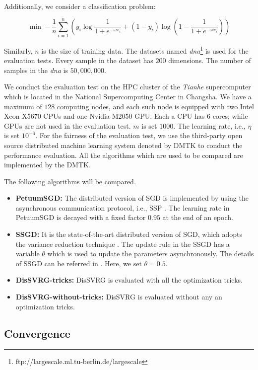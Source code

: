 \documentclass[10pt,journal,finalsubmission,compsoc]{IEEEtran}
\begin{document}
Additionally, we consider a classification problem:

\begin{equation}
\label{standard_sgd}
\min -\frac{1}{n}\sum\limits_{i=1}^n\left(y_i\log\frac{1}{1+e^{-\omega x_i}}+(1-y_i)\log(1-\frac{1}{1+e^{-\omega x_i}})\right)
\end{equation}

Similarly, $n$ is the size of training data. The datasets named \emph{dna}\footnote{ftp://largescale.ml.tu-berlin.de/largescale} is used for the evaluation tests. Every sample in the dataset has $200$ dimensions.  The number of samples in the \emph{dna} is $50,000,000$.

We conduct the evaluation test on the HPC cluster of the \emph{Tianhe} supercomputer which is located in the National Supercomputing Center in Changsha.   We have a maximum of $128$ computing nodes, and each such node is equipped with two Intel Xeon X5670 CPUs  and  one Nvidia M2050 GPU. Each a CPU has $6$ cores; while GPUs are not used in the evaluation test.  $m$  is set $1000$. The learning rate, i.e., $\eta$ is set $10^{-6}$.
For the fairness of the evaluation test, we use the third-party open source distributed machine learning system denoted by DMTK \cite{Yuan:2015ka} to conduct  the performance evaluation. All the algorithms which are used to be compared are implemented by the DMTK. 


The following algorithms will be  compared.
\begin{itemize}
\item \textbf{PetuumSGD:} The distributed version of SGD is implemented by using the asynchronous communication protocol, i.e., SSP \cite{Xing:2015ib}.  The learning rate in PetuumSGD is decayed with a fixed factor $0.95$ at the end of an epoch.  
\item \textbf{SSGD:} It is the state-of-the-art distributed version of SGD, which adopts the variance reduction technique \cite{Zhang:2015tp}. The update rule in the SSGD has a variable $\theta$ which is used to update the parameters asynchronously. The details of SSGD can be referred in \cite{Zhang:2015tp}. Here, we set $\theta=0.5$.
\item \textbf{DisSVRG-tricks:} DisSVRG is evaluated with all the optimization tricks.
\item \textbf{DisSVRG-without-tricks:} DisSVRG is evaluated without any an optimization tricks.
\end{itemize}
\subsection{Convergence}
\end{document}
